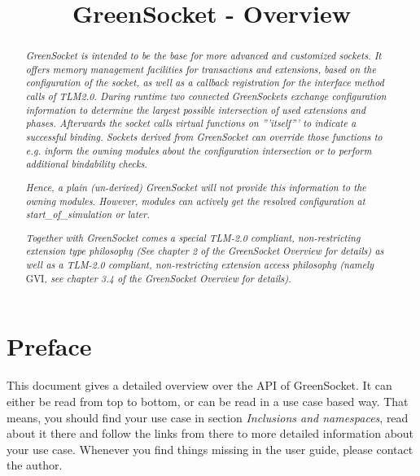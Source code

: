 \documentclass[a4paper,10pt]{article}          %
\title{GreenSocket - Overview}
\author{\sffamily{Robert G\"unzel (GreenSocs)}}
\date{}
\begin{document}
\maketitle

\thispagestyle{empty}


\begin{abstract}
\noindent
\emph{GreenSocket is intended to be the base for more advanced and customized sockets. It offers memory management facilities for transactions and extensions, based on the configuration of the socket, as well as a callback registration for the interface method calls of TLM2.0.
During runtime two connected GreenSockets exchange configuration information to determine the largest possible intersection of used extensions and phases. Afterwards the socket calls virtual functions on '''itself''' to indicate a successful binding. Sockets derived from GreenSocket can override those functions to e.g. inform the owning modules about the configuration intersection or to perform additional bindability checks.}

\emph{
Hence, a plain (un-derived) GreenSocket will not provide this information to the owning modules. However, modules can actively get the resolved configuration at start\_of\_simulation or later.}

\emph{
Together with GreenSocket comes a special TLM-2.0 compliant, non-restricting extension type philosophy (See chapter 2 of the GreenSocket Overview for details) as well as a TLM-2.0 compliant, non-restricting extension access philosophy (namely} GVI\emph{, see chapter 3.4 of the GreenSocket Overview for details).
}
\end{abstract}


\tableofcontents\newpage
\section{Preface}

This document gives a detailed overview over the API of GreenSocket. It can either be read from top to bottom, or can be read in a use case based way. That means, you should find your use case in section \emph{Inclusions and namespaces}, read about it there and follow the links from there to more detailed information about your use case. Whenever you find things missing in the user guide, please contact the author.
\end{document}
